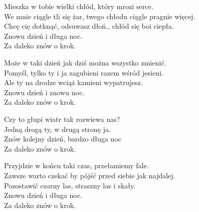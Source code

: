 \begin{text}
    Mieszka w tobie wielki chłód, który mrozi serce.\\
    We mnie ciągle tli się żar, twego chłodu ciągle pragnie więcej.\\
    Chcę cię dotknąć, odsuwasz dłoń., chłód się boi ciepła.\\
    Znowu dzień i długa noc.\\
    Za daleko znów o krok.

    Może w taki dzień jak dziś można wszystko zmienić.\\
    Pomyśl, tylko ty i ja zagubieni razem wśród jesieni.\\
    Ale ty na drodze wciąż kamieni wypatrujesz.\\
    Znowu dzień i znowu noc.\\
    Za daleko znów o krok.

    Czy to głupi wiatr tak rozwiewa nas?\\
    Jedną drogą ty, w drugą stronę ja.\\
    Znów kolejny dzień, bardzo długa noc\\
    Za daleko znów o krok.

    Przyjdzie w końcu taki czas, przełamiemy fale.\\
    Zawsze warto czekać by pójść przed siebie jak najdalej.\\
    Pozostawić czarny las, straszny las i skały.\\
    Znowu dzień i długa noc.\\
    Za daleko znów o krok.
\end{text}
\begin{chord}

\end{chord}